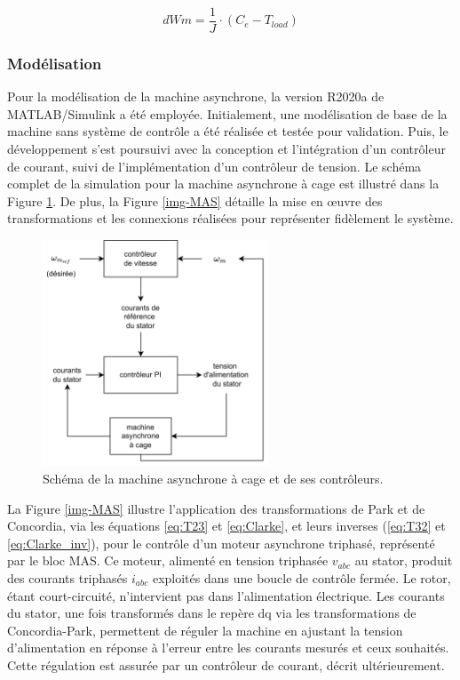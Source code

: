 

\begin{equation}
    dWm = \frac{1}{J} \cdot (C_e - T_{load})
    \label{eq:dWm}
\end{equation}


\newpage
\FloatBarrier
\subsubsection{Modélisation}


Pour la modélisation de la machine asynchrone, la version R2020a de MATLAB/Simulink a été employée. Initialement, une modélisation de base de la machine sans système de contrôle a été réalisée et testée pour validation. Puis, le développement s'est poursuivi avec la conception et l'intégration d'un contrôleur de courant, suivi de l'implémentation d'un contrôleur de tension. Le schéma complet de la simulation pour la machine asynchrone à cage est illustré dans la Figure \ref{img-diagMAS}. De plus, la Figure \ref{img-MAS} détaille la mise en œuvre des transformations et les connexions réalisées pour représenter fidèlement le système.

\begin{figure}[!h]
    \centering
    \includegraphics[width=0.6\textwidth]{diagrammes/diagMAS.png} 
    \caption{Schéma de la machine asynchrone à cage et de ses contrôleurs.}
    \label{img-diagMAS}
\end{figure}

La Figure \ref{img-MAS} illustre l'application des transformations de Park et de Concordia, via les équations \ref{eq:T23} et \ref{eq:Clarke}, et leurs inverses (\ref{eq:T32} et \ref{eq:Clarke_inv}), pour le contrôle d'un moteur asynchrone triphasé, représenté par le bloc MAS. Ce moteur, alimenté en tension triphasée $v_{abc}$ au stator, produit des courants triphasés $i_{abc}$ exploités dans une boucle de contrôle fermée. Le rotor, étant court-circuité, n'intervient pas dans l'alimentation électrique. Les courants du stator, une fois transformés dans le repère dq via les transformations de Concordia-Park, permettent de réguler la machine en ajustant la tension d'alimentation en réponse à l'erreur entre les courants mesurés et ceux souhaités. Cette régulation est assurée par un contrôleur de courant, décrit ultérieurement.

